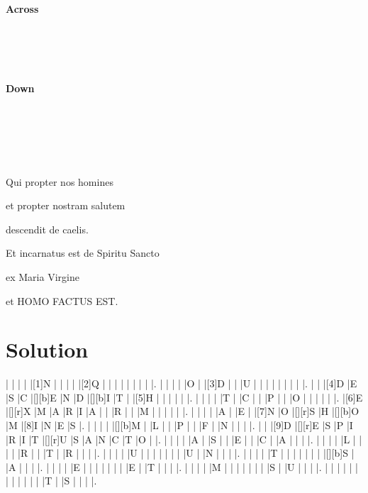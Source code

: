 \documentclass[12pt,a4paper]{article}
\begin{document}
\begin{PuzzleClues}{\textbf{Across}}\\
\\
\\
\\
\\
\end{PuzzleClues}%
\begin{PuzzleClues}{\textbf{Down}}\\
\\
\\
\\
\\
\\
\end{PuzzleClues}

\bigskip

Qui propter nos homines

et propter nostram salutem

descendit de caelis.

Et incarnatus est de Spiritu Sancto

ex Maria Virgine

et HOMO FACTUS EST.



\newpage

\section{Solution}

\PuzzleSolution 

\begin{Puzzle}{18}{15}
|{} |{} |{} |{} |[1]N |{} |{} |{} |{} |[2]Q |{} |{} |{} |{} |{} |{} |{} |{} |.
|{} |{} |{} |{} |O |{} |[3]D |{} |{} |U |{} |{} |{} |{} |{} |{} |{} |{} |.
|{} |{} |[4]D |E |S |C |[][b]E |N |D |[][b]I |T |{} |[5]H |{} |{} |{} |{} |{} |.
|{} |{} |{} |{} |T |{} |C |{} |{} |P |{} |{} |O |{} |{} |{} |{} |{} |.
|[6]E |[][r]X |M |A |R |I |A |{} |{} |R |{} |{} |M |{} |{} |{} |{} |{} |.
|{} |{} |{} |{} |A |{} |E |{} |[7]N |O |[][r]S |H |[][b]O |M |[8]I |N |E |S |.
|{} |{} |{} |{} |[][b]M |{} |L |{} |{} |P |{} |{} |F |{} |N |{} |{} |{} |.
|{} |{} |[9]D |[][r]E |S |P |I |R |I |T |[][r]U |S |A |N |C |T |O |{} |.
|{} |{} |{} |{} |A |{} |S |{} |{} |E |{} |{} |C |{} |A |{} |{} |{} |.
|{} |{} |{} |{} |L |{} |{} |{} |{} |R |{} |{} |T |{} |R |{} |{} |{} |.
|{} |{} |{} |{} |U |{} |{} |{} |{} |{} |{} |{} |U |{} |N |{} |{} |{} |.
|{} |{} |{} |{} |T |{} |{} |{} |{} |{} |{} |{} |[][b]S |{} |A |{} |{} |{} |.
|{} |{} |{} |{} |E |{} |{} |{} |{} |{} |{} |{} |E |{} |T |{} |{} |{} |.
|{} |{} |{} |{} |M |{} |{} |{} |{} |{} |{} |{} |S |{} |U |{} |{} |{} |.
|{} |{} |{} |{} |{} |{} |{} |{} |{} |{} |{} |{} |T |{} |S |{} |{} |{} |.
\end{Puzzle}
\end{document}
